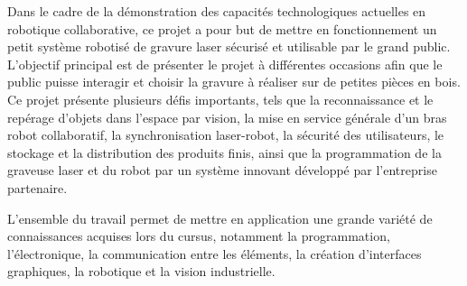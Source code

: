 
Dans le cadre de la démonstration des capacités technologiques actuelles en robotique collaborative, 
ce projet a pour but de mettre en fonctionnement un petit système robotisé de gravure laser sécurisé 
et utilisable par le grand public. L'objectif principal est de présenter le projet à différentes occasions 
afin que le public puisse interagir et choisir la gravure à réaliser sur de petites pièces en bois. Ce projet 
présente plusieurs défis importants, tels que la reconnaissance et le repérage d'objets dans l'espace
par vision, la mise en service générale d'un bras robot collaboratif, la synchronisation laser-robot, 
la sécurité des utilisateurs, le stockage et la distribution des produits finis, ainsi que la programmation
de la graveuse laser et du robot par un système innovant développé par l'entreprise partenaire.

L'ensemble du travail permet de mettre en application une grande variété de connaissances acquises lors
du cursus, notamment la programmation, l’électronique, la communication entre les éléments, la création
d'interfaces graphiques, la robotique et la vision industrielle.


